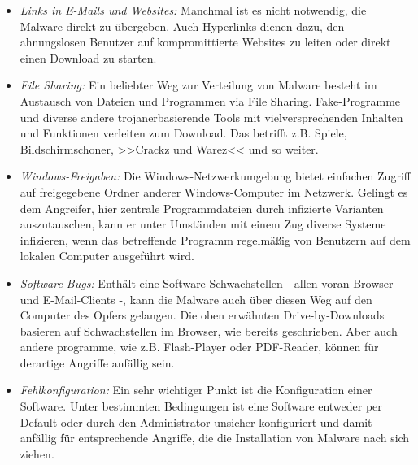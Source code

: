 \begin{itemize}
	\item \textit{Links in E-Mails und Websites:} Manchmal ist es nicht notwendig, die Malware direkt zu übergeben. Auch Hyperlinks dienen dazu, den ahnungslosen Benutzer auf kompromittierte Websites zu leiten oder direkt einen Download zu starten.
	\item \textit{File Sharing:} Ein beliebter Weg zur Verteilung von Malware besteht im Austausch von Dateien und Programmen via File Sharing. Fake-Programme und diverse andere trojanerbasierende Tools mit vielversprechenden Inhalten und Funktionen verleiten zum Download. Das betrifft z.B. Spiele, Bildschirmschoner, >>Crackz und Warez<< und so weiter.
	\item \textit{Windows-Freigaben:} Die Windows-Netzwerkumgebung bietet einfachen Zugriff auf freigegebene Ordner anderer Windows-Computer im Netzwerk. Gelingt es dem Angreifer, hier zentrale Programmdateien durch infizierte Varianten auszutauschen, kann er unter Umständen mit einem Zug diverse Systeme infizieren, wenn das betreffende Programm regelmäßig von Benutzern auf dem lokalen Computer ausgeführt wird.
	\item \textit{Software-Bugs:} Enthält eine Software Schwachstellen - allen voran Browser und E-Mail-Clients -, kann die Malware auch über diesen Weg auf den Computer des Opfers gelangen. Die oben erwähnten Drive-by-Downloads basieren auf Schwachstellen im Browser, wie bereits geschrieben. Aber auch andere programme, wie z.B. Flash-Player oder PDF-Reader, können für derartige Angriffe anfällig sein.
	\item \textit{Fehlkonfiguration:} Ein sehr wichtiger Punkt ist die Konfiguration einer Software. Unter bestimmten Bedingungen ist eine Software entweder per Default oder durch den Administrator unsicher konfiguriert und damit anfällig für entsprechende Angriffe, die die Installation von Malware nach sich ziehen.
\end{itemize}


